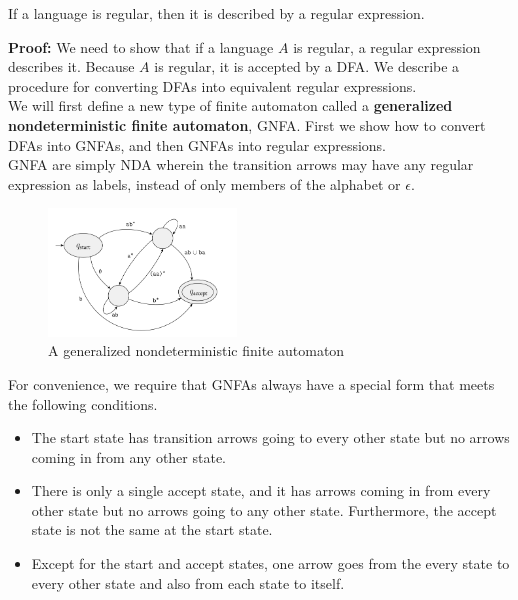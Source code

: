 \begin{lemma}
    If a language is regular, then it is described by a regular expression.
\end{lemma}

\textbf{Proof:} We need to show that if a language $A$ is regular, a regular
expression describes it. Because $A$ is regular, it is accepted by a DFA. We
describe a procedure for converting DFAs into equivalent regular expressions.\\

We will first define a new type of finite automaton called a
\textbf{generalized nondeterministic finite automaton}, GNFA. First we show
how to convert DFAs into GNFAs, and then GNFAs into regular expressions.\\

GNFA are simply NDA wherein the transition arrows may have any regular
expression as labels, instead of only members of the alphabet or $\epsilon$.

\begin{figure}[h!]
    \begin{center}
        \includegraphics[width=5cm]{img/161.png}
        \caption{A generalized nondeterministic finite automaton}
    \end{center}
\end{figure}

For convenience, we require that GNFAs always have a special form that meets
the following conditions.

\begin{itemize}
    \item The start state has transition arrows going to every other state but
        no arrows coming in from any other state.
    \item There is only a single accept state, and it has arrows coming in
        from every other state but no arrows going to any other state. 
        Furthermore, the accept state is not the same at the start state.
    \item Except for the start and accept states, one arrow goes from the
        every state to every other state and also from each state to itself.
\end{itemize}

